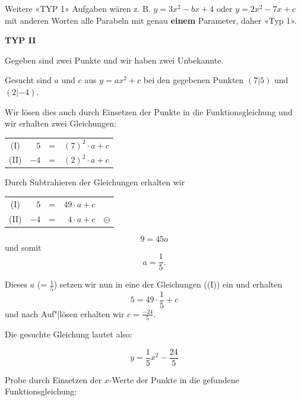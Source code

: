 
Weitere «TYP 1» Aufgaben wären z. B. $y = 3x^2 - bx + 4$ oder $y=2x^2
-7x + c$ mit anderen Worten alle Parabeln mit genau \textbf{einem}
Parameter, daher «Typ 1».

\newpage



\textbf{TYP II}

Gegeben sind zwei Punkte und wir haben zwei Unbekannte.

\begin{rezept}{}{}
  Gesucht sind $a$ und $c$ aus $y = ax^2 + c$ bei den gegebenen
  Punkten $(7|5)$ und $(2|-4)$.

  Wir lösen dies auch durch Einsetzen der Punkte in die
  Funktionsgleichung und wir erhalten zwei Gleichungen:


  \begin{tabular}{c | r  c  r |}
    (I)  &  $5$ & = & $(7)^2\cdot{} a + c$ \\
    (II) & $-4$ & = &  $(2)^2\cdot{} a + c$ \\
  \end{tabular}

  Durch Subtrahieren der Gleichungen erhalten wir

  \begin{tabular}{c | r  c  r | c}
    (I)  &  $5$ & = & $49\cdot{} a + c$ & \,\\
    (II) & $-4$ & = &  $4\cdot{} a + c$ & $\ominus$\\
  \end{tabular}

  $$9 = 45a$$ und somit
  $$a =\frac{1}{5}.$$

  Dieses $a$ (= $\frac{1}{5}$) setzen wir nun in eine der Gleichungen
  (\zB (I)) ein und erhalten
  $$5=49\cdot{}\frac{1}{5} + c$$
  und nach Auf"|lösen erhalten wir $c=\frac{-24}{5}$.

  Die gesuchte Gleichung lautet also:

  $$y = \frac{1}{5}x^2 - \frac{24}{5}$$
\end{rezept}

Probe durch Einsetzen der $x$-Werte der Punkte in die gefundene Funktionsgleichung:

\newpage

